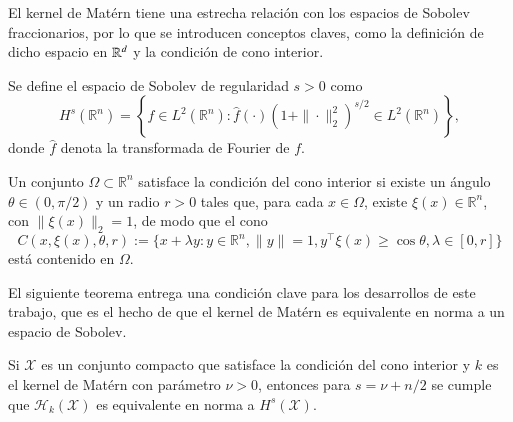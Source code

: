 El kernel de Matérn tiene una estrecha relación con los espacios de Sobolev fraccionarios, por lo que se introducen conceptos claves, como la definición de dicho espacio en $\mathbb{R}^d$ y la condición de cono interior.

\begin{defn} Se define el espacio de Sobolev de regularidad $s > 0$ como
\[
H^s(\mathbb{R}^n) = \left\{ f \in L^2(\mathbb{R}^n) : \widehat{f}(\cdot)(1 + \|\cdot\|_2^2)^{s/2} \in L^2(\mathbb{R}^n) \right\},
\]
donde \( \widehat{f} \) denota la transformada de Fourier de \( f \).
\label{def:frac_sob}
\end{defn}

\begin{defn}
Un conjunto \( \Omega \subset \mathbb{R}^n \) satisface la condición del cono interior si existe un ángulo \( \theta \in (0, \pi/2) \) y un radio \( r > 0 \) tales que, para cada \( x \in \Omega \), existe \( \xi(x) \in \mathbb{R}^n \), con \( \|\xi(x)\|_2 = 1 \), de modo que el cono
\[
C(x, \xi(x), \theta, r) := \{x + \lambda y : y \in \mathbb{R}^n, \|y\| = 1, y^\top \xi(x) \geq \cos \theta, \lambda \in [0, r]\}
\]
está contenido en \( \Omega \).
\end{defn}
El siguiente teorema entrega una condición clave para los desarrollos de este trabajo, que es el hecho de que el kernel de Matérn es equivalente en norma a un espacio de Sobolev.
\begin{teo}
Si \( \mathcal{X} \) es un conjunto compacto que satisface la condición del cono interior y \( k \) es el kernel de Matérn con parámetro \( \nu > 0 \), entonces para \( s = \nu + n/2 \) se cumple que \( \mathcal{H}_k (\mathcal{X}) \) es equivalente en norma a \( H^s (\mathcal{X}) \).
\end{teo}

